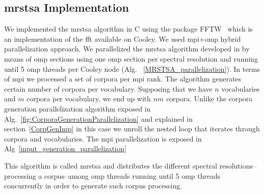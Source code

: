 \documentclass[11pt,a4paper]{article}
\begin{document}
\subsection{\gls{mrstsa} Implementation}

We implemented the \gls{mrstsa} algorithm in C using the package FFTW~\cite{fftw} which is an implementation of the \gls{fft} available on Cooley. We used \gls{mpi}+\gls{omp} hybrid parallelization approach. We parallelized the \gls{mrstsa} algorithm developed in \cite{Dematties2018} by means of \gls{omp} sections using one \gls{omp} section per spectral resolution and running until 5 \gls{omp} threads per Cooley node (Alg. ~\ref{MRSTSA_parallelization}). In terms of \gls{mpi} we processed a set of corpora per \gls{mpi} rank. The algorithm generates certain number of corpora per vocabulary. Supposing that we have $n$ vocabularies and $m$ corpora per vocabulary, we end up with $n m$ corpora. Unlike the corpora generation parallelization algorithm exposed in Alg.~\ref{fig:CorporaGenerationParallelization} and explained in section~\ref{CorpGenImp} in this case we unroll the nested loop that iterates through corpora and vocabularies. The \gls{mpi} parallelization is exposed in Alg~\ref{input_generation_parallelization}


\begin{algorithm}
	\caption{This algorithm is called \gls{mrstsa} and distributes the different spectral resolutions--processing a corpus--among \gls{omp} threads running until 5 \gls{omp} threads concurrently in order to generate such corpus processing.}
\label{MRSTSA_parallelization}
\begin{algorithmic}[1]
\end{algorithmic}
\end{algorithm}
\end{document}
